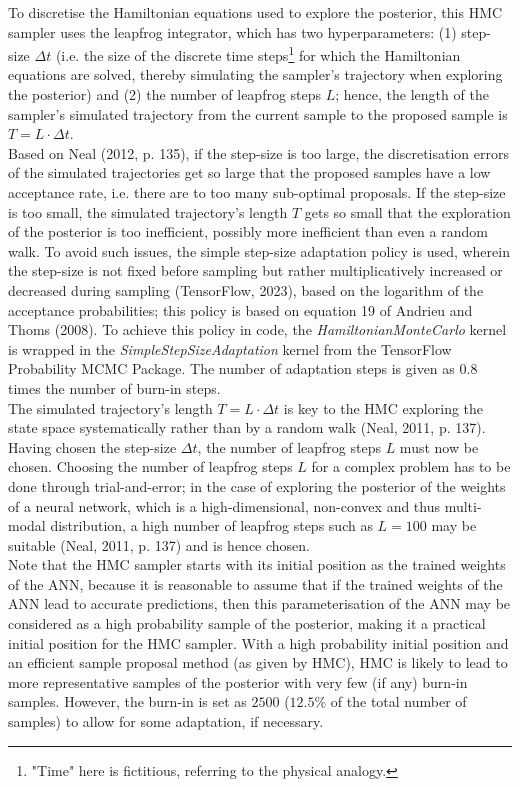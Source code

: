 \documentclass[conference]{IEEEtran}
\begin{document}
To discretise the Hamiltonian equations used to explore the posterior, this HMC sampler uses the leapfrog integrator, which has two hyperparameters: (1) step-size $\Delta t$ (i.e. the size of the discrete time steps\footnote{"Time" here is fictitious, referring to the physical analogy.} for which the Hamiltonian equations are solved, thereby simulating the sampler's trajectory when exploring the posterior) and (2) the number of leapfrog steps $L$; hence, the length of the sampler's simulated trajectory from the current sample to the proposed sample is $T = L \cdot \Delta t$.\\

Based on Neal (2012, p. 135), if the step-size is too large, the discretisation errors of the simulated trajectories get so large that the proposed samples have a low acceptance rate, i.e. there are to too many sub-optimal proposals. If the step-size is too small, the simulated trajectory's length $T$ gets so small that the exploration of the posterior is too inefficient, possibly more inefficient than even a random walk. To avoid such issues, the simple step-size adaptation policy is used, wherein the step-size is not fixed before sampling but rather multiplicatively increased or decreased during sampling (TensorFlow, 2023), based on the logarithm of the acceptance probabilities; this policy is based on equation 19 of Andrieu and Thoms (2008). To achieve this policy in code, the \textit{HamiltonianMonteCarlo} kernel is wrapped in the \textit{SimpleStepSizeAdaptation} kernel from the TensorFlow Probability MCMC Package. The number of adaptation steps is given as 0.8 times the number of burn-in steps.\\

The simulated trajectory's length $T = L \cdot \Delta t$ is key to the HMC exploring the state space systematically rather than by a random walk (Neal, 2011, p. 137). Having chosen the step-size $\Delta t$, the number of leapfrog steps $L$ must now be chosen. Choosing the number of leapfrog steps $L$ for a complex problem has to be done through trial-and-error; in the case of exploring the posterior of the weights of a neural network, which is a high-dimensional, non-convex and thus multi-modal distribution, a high number of leapfrog steps such as $L = 100$ may be suitable (Neal, 2011, p. 137) and is hence chosen.\\

Note that the HMC sampler starts with its initial position as the trained weights of the ANN, because it is reasonable to assume that if the trained weights of the ANN lead to accurate predictions, then this parameterisation of the ANN may be considered as a high probability sample of the posterior, making it a practical initial position for the HMC sampler. With a high probability initial position and an efficient sample proposal method (as given by HMC), HMC is likely to lead to more representative samples  of the posterior with very few (if any) burn-in samples. However, the burn-in is set as $2500$ ($12.5\%$ of the total number of samples) to allow for some adaptation, if necessary.
\end{document}

